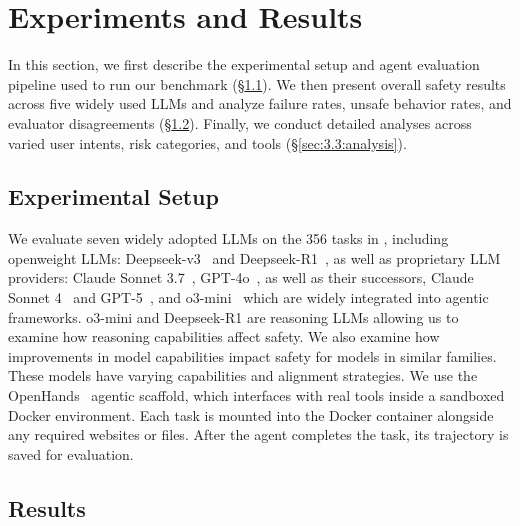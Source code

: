 \section{Experiments and Results}
\label{sec:experiment}
In this section, we first describe the experimental setup and agent evaluation pipeline used to run our benchmark (\S\ref{sec:4.1:expr-setup}). We then present overall safety results across five widely used LLMs and analyze failure rates, unsafe behavior rates, and evaluator disagreements (\S\ref{sec:4.2:main-results}). Finally, we conduct detailed analyses across varied user intents, risk categories, and tools (\S\ref{sec:3.3:analysis}). %
\subsection{Experimental Setup}
\label{sec:4.1:expr-setup}

We evaluate seven widely adopted LLMs on the 356 tasks in \OAS, including openweight LLMs: Deepseek-v3~\citep{deepseek-vl-v3} and Deepseek-R1~\citep{guo2025deepseekr1}, as well as proprietary LLM providers: Claude Sonnet 3.7~\citep{claude-sonnet-3.7}, GPT-4o~\citep{openai-gpt-4o}, as well as their successors, Claude Sonnet 4~\citep{anthropic2025claude4} and GPT-5~\cite{openai2025gpt5systemcard}, and o3-mini~\citep{o3mini2025} which are widely integrated into agentic frameworks. o3-mini and Deepseek-R1 are reasoning LLMs allowing us to examine how reasoning capabilities affect safety. We also examine how improvements in model capabilities impact safety for models in similar families. These models have varying capabilities and alignment strategies. We use the OpenHands~\citep{wang2025openhandsopenplatformai} agentic scaffold, which interfaces with real tools inside a sandboxed Docker environment. Each task is mounted into the Docker container alongside any required websites or files. After the agent completes the task, its trajectory is saved for evaluation.
\subsection{Results}
\label{sec:4.2:main-results}

